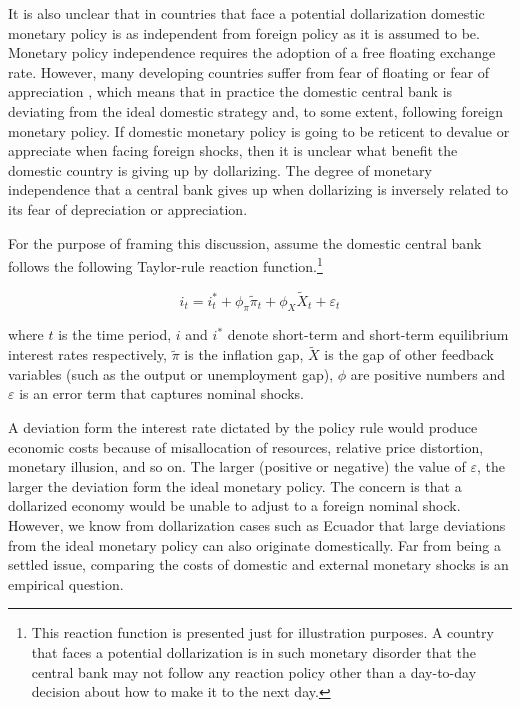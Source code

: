 \documentclass[12pt]{article}
\begin{document}
It is also unclear that in countries that face a potential dollarization domestic monetary policy is as independent from foreign policy as it is assumed to be. Monetary policy independence requires the adoption of a free floating exchange rate. However, many developing countries suffer from fear of floating or fear of appreciation \parencite{Calvo2002, Levy-Yeyati2003}, which means that in practice the domestic central bank is deviating from the ideal domestic strategy and, to some extent, following foreign monetary policy. If domestic monetary policy is going to be reticent to devalue or appreciate when facing foreign shocks, then it is unclear what benefit the domestic country is giving up by dollarizing. The degree of monetary independence that a central bank gives up when dollarizing is inversely related to its fear of depreciation or appreciation.

For the purpose of framing this discussion, assume the domestic central bank follows the following Taylor-rule reaction function.\footnote{This reaction function is presented just for illustration purposes. A country that faces a potential dollarization is in such monetary disorder that the central bank may not follow any reaction policy other than a day-to-day decision about how to make it to the next day.}

\begin{equation} \label{Eq:1}
    i_t = i^*_t + \phi_\pi \tilde{\pi}_t + \phi_X \tilde{X}_t + \varepsilon_t
\end{equation}

where $t$ is the time period, $i$ and $i^*$ denote short-term and short-term equilibrium interest rates respectively, $\tilde{\pi}$ is the inflation gap, $\tilde{X}$ is the gap of other feedback variables (such as the output or unemployment gap), $\phi$ are positive numbers and $\varepsilon$ is an error term that captures nominal shocks.

A deviation form the interest rate dictated by the policy rule would produce economic costs because of misallocation of resources, relative price distortion, monetary illusion, and so on. The larger (positive or negative) the value of $\varepsilon$, the larger the deviation form the ideal monetary policy. The concern is that a dollarized economy would be unable to adjust to a foreign nominal shock. However, we know from dollarization cases such as Ecuador that large deviations from the ideal monetary policy can also originate domestically. Far from being a settled issue, comparing the costs of domestic and external monetary shocks is an empirical question.
\end{document}
